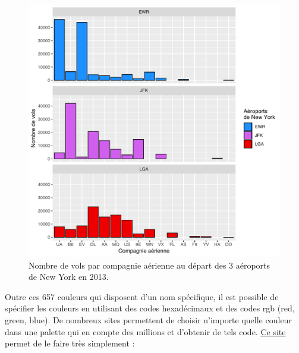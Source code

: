 \documentclass[a4paperpaper,]{article}
\newenvironment{Shaded}{\begin{snugshade}}{\end{snugshade}}
\newcommand{\CharTok}[1]{\textcolor[rgb]{0.57,0.30,0.62}{#1}}
\newcommand{\DataTypeTok}[1]{\textcolor[rgb]{0.00,0.34,0.68}{#1}}
\newcommand{\DecValTok}[1]{\textcolor[rgb]{0.69,0.50,0.00}{#1}}
\newcommand{\KeywordTok}[1]{\textcolor[rgb]{0.12,0.11,0.11}{\textbf{#1}}}
\newcommand{\NormalTok}[1]{\textcolor[rgb]{0.12,0.11,0.11}{#1}}
\newcommand{\OperatorTok}[1]{\textcolor[rgb]{0.12,0.11,0.11}{#1}}
\newcommand{\StringTok}[1]{\textcolor[rgb]{0.75,0.01,0.01}{#1}}
\theoremstyle{definition}
\theoremstyle{definition}
\theoremstyle{definition}
\theoremstyle{remark}
\begin{document}
\begin{figure}[htpb]

{\centering \includegraphics[width=0.9\linewidth]{figure/barfacetmanual-1} 

}

\caption{Nombre de vols par compagnie aérienne au départ des 3 aéroports de New York en 2013.}\label{fig:barfacetmanual}
\end{figure}

Outre ces 657 couleurs qui disposent d'un nom spécifique, il est
possible de spécifier les couleurs en utilisant des codes hexadécimaux
et des codes rgb (red, green, blue). De nombreux sites permettent de
choisir n'importe quelle couleur dans une palette qui en compte des
millions et d'obtenir de tels code. \href{https://www.color-hex.com}{Ce
site} permet de le faire très simplement :

\begin{Shaded}
\end{Shaded}
\end{document}
